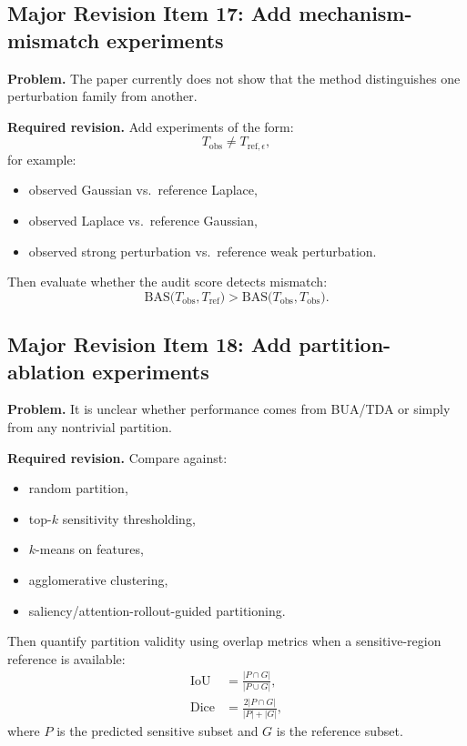 \subsection*{Major Revision Item 17: Add mechanism-mismatch experiments}
\textbf{Problem.} The paper currently does not show that the method distinguishes one perturbation family from another.

\textbf{Required revision.}
Add experiments of the form:
\[
T_{\mathrm{obs}} \neq T_{\mathrm{ref},\epsilon},
\]
for example:
\begin{itemize}
    \item observed Gaussian vs.\ reference Laplace,
    \item observed Laplace vs.\ reference Gaussian,
    \item observed strong perturbation vs.\ reference weak perturbation.
\end{itemize}

Then evaluate whether the audit score detects mismatch:
\[
\mathrm{BAS}\bigl(T_{\mathrm{obs}},T_{\mathrm{ref}}\bigr)
>
\mathrm{BAS}\bigl(T_{\mathrm{obs}},T_{\mathrm{obs}}\bigr).
\]

\subsection*{Major Revision Item 18: Add partition-ablation experiments}
\textbf{Problem.} It is unclear whether performance comes from BUA/TDA or simply from any nontrivial partition.

\textbf{Required revision.}
Compare against:
\begin{itemize}
    \item random partition,
    \item top-$k$ sensitivity thresholding,
    \item $k$-means on features,
    \item agglomerative clustering,
    \item saliency/attention-rollout-guided partitioning.
\end{itemize}

Then quantify partition validity using overlap metrics when a sensitive-region reference is available:
\begin{align}
\mathrm{IoU}
&=
\frac{|P \cap G|}{|P \cup G|}, \\
\mathrm{Dice}
&=
\frac{2|P \cap G|}{|P| + |G|},
\end{align}
where $P$ is the predicted sensitive subset and $G$ is the reference subset.

